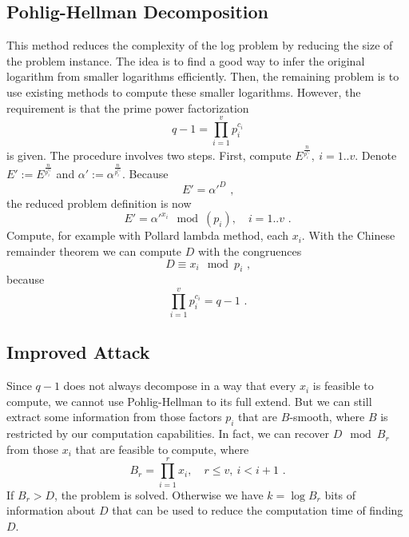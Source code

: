 \documentclass[paper=a4, fontsize=11pt]{scrartcl} %
\numberwithin{equation}{section} %
\numberwithin{figure}{section} %
\numberwithin{table}{section} %
\begin{document}
\subsection{Pohlig-Hellman Decomposition} This method reduces the complexity of the log problem by reducing the size of the problem instance. The idea is to find a good way to infer the original logarithm from smaller logarithms efficiently. Then, the remaining problem is to use existing methods to compute these smaller logarithms. However, the requirement is that the prime power factorization
\begin{equation}
q-1 = \prod_{i=1}^v p_i^{c_i}
\end{equation}
is given. The procedure involves two steps. First, compute $E^{\frac{n}{p_i^{c_i}}},\ i=1..v$. Denote $E':= E^{\frac{n}{p_i^{c_i}}}$ and $\alpha' := \alpha^{\frac{n}{p_i^{c_i}}}$. Because
\begin{equation}
E' = \alpha'^D
\text{ ,}
\end{equation}
the reduced problem definition is now
\begin{equation}
E' = \alpha'^{x_i} \mod (p_i),\quad i=1..v
\text{ .}
\end{equation}
Compute, for example with Pollard lambda method, each $x_i$. With the Chinese remainder theorem we can compute $D$ with the congruences
\begin{equation}
D \equiv x_i \mod p_i
\text{ ,}
\end{equation}
because
\begin{equation}
\prod_{i=1}^v p_i^{c_i} = q-1
\text{ .}
\end{equation}

\subsection{Improved Attack}
Since $q-1$ does not always decompose in a way that every $x_i$ is feasible to compute, we cannot use Pohlig-Hellman to its full extend. But we can still extract some information from those factors $p_i$ that are $B$-smooth, where $B$ is restricted by our computation capabilities. In fact, we can recover $D\mod B_r$ from those $x_i$ that are feasible to compute, where
\begin{equation}
B_r = \prod_{i=1}^r x_i,\quad r\leq v,\ i < i+1
\text{ .}
\end{equation}
If $B_r > D$, the problem is solved. Otherwise we have $k = \log B_r$ bits of information about $D$ that can be used to reduce the computation time of finding $D$.
\end{document}
